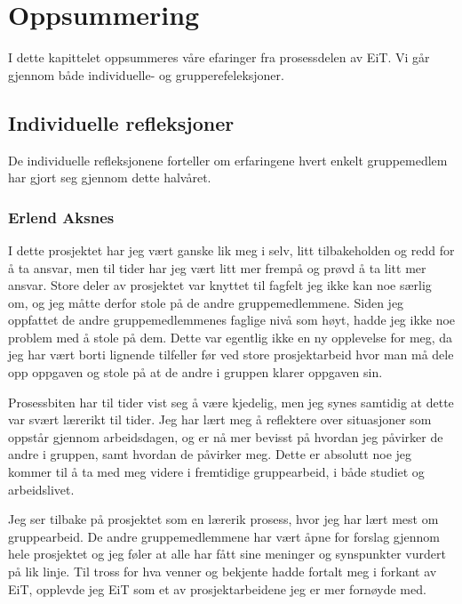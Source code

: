 \chapter{Oppsummering}
I dette kapittelet oppsummeres våre efaringer fra prosessdelen av EiT.
Vi går gjennom både individuelle- og grupperefeleksjoner.

\section{Individuelle refleksjoner}
\label{individuellerefleksjoner}
De individuelle refleksjonene forteller om erfaringene hvert enkelt gruppemedlem
har gjort seg gjennom dette halvåret.

\subsection*{Erlend Aksnes}
I dette prosjektet har jeg vært ganske lik meg i selv, litt tilbakeholden og redd for å ta ansvar, men til tider har jeg vært litt mer frempå og prøvd å ta litt mer ansvar. Store deler av prosjektet var knyttet til fagfelt jeg ikke kan noe særlig om, og jeg måtte derfor stole på de andre gruppemedlemmene. Siden jeg oppfattet de andre gruppemedlemmenes faglige nivå som høyt, hadde jeg ikke noe problem med å stole på dem. Dette var egentlig ikke en ny opplevelse for meg, da jeg har vært borti lignende tilfeller før ved store prosjektarbeid hvor man må dele opp oppgaven og stole på at de andre i gruppen klarer oppgaven sin. 

Prosessbiten har til tider vist seg å være kjedelig, men jeg synes samtidig at dette var svært lærerikt til tider. Jeg har lært meg å reflektere over situasjoner som oppstår gjennom arbeidsdagen, og er nå mer bevisst på hvordan jeg påvirker de andre i gruppen, samt hvordan de påvirker meg. Dette er absolutt noe jeg kommer til å ta med meg videre i fremtidige gruppearbeid, i både studiet og arbeidslivet.

Jeg ser tilbake på prosjektet som en lærerik prosess, hvor jeg har lært mest om gruppearbeid. De andre gruppemedlemmene har vært åpne for forslag gjennom hele prosjektet og jeg føler at alle har fått sine meninger og synspunkter vurdert på lik linje. Til tross for hva venner og bekjente hadde fortalt meg i forkant av EiT, opplevde jeg EiT som et av prosjektarbeidene jeg er mer fornøyde med. 


